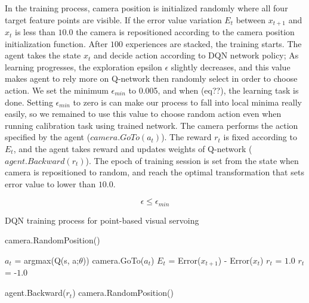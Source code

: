 \documentclass[10pt]{article}
\begin{document}
In the training process, camera position is initialized randomly where all four target feature points are visible. If the error value variation $E_t$ between $x_{t+1}$ and $x_t$ is less than $10.0$ the camera is repositioned according to the camera position initialization function. After $100$ experiences are stacked, the training starts. The agent takes the state $x_t$ and decide action according to DQN network policy; As learning progresses, the exploration epsilon $\epsilon$ slightly decreases, and this value makes agent to rely more on Q-network then randomly select in order to choose action. We set the minimum $\epsilon_{min}$ to 0.005, and when (eq??), the learning task is done. Setting $\epsilon_{min}$ to zero is can make our process to fall into local minima really easily, so we remained to use this value to choose random action even when running calibration task using trained network. The camera performs the action specified by the agent ($camera.GoTo(a_t)$). The reward $r_t$ is fixed according to $E_t$, and the agent takes reward and updates weights of Q-network ($agent.Backward(r_t)$).
The epoch of training session is set from the state when camera is repositioned to random, and reach the optimal transformation that sets error value to lower than $10.0$.

\begin{equation}\label{ext}
  \epsilon \leq \epsilon_{min}
\end{equation}

 \begin{algorithm}
   \caption{DQN training process for point-based visual servoing}\label{algo1}
   \begin{algorithmic}[1]

     \State camera.RandomPosition()



     \State $a_t$ =  argmax(Q(s, a;$\theta$))
     \State camera.GoTo($a_t$)
     \State $E_t$ = Error($x_{t+1}$) - Error($x_t$)
     \State $r_t$ = $1.0$
     \Else
     \State $r_t$ = -$1.0$
     \EndIf

     agent.Backward($r_t$)
     camera.RandomPosition()
     \EndIf

     \EndFor

   \end{algorithmic}
 \end{algorithm}
\end{document}
